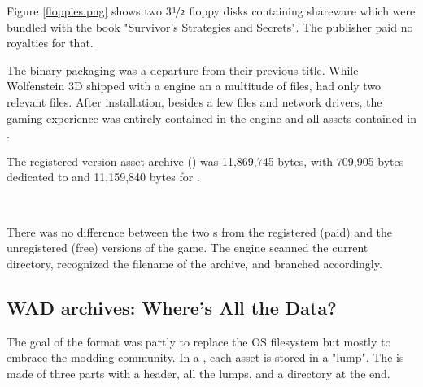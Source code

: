\par
\vspace{-10pt}
Figure \ref{floppies.png} shows two 3$\nicefrac{1}{2}$ floppy disks containing \doom{} shareware which were bundled with the book "Survivor's Strategies and Secrets". The publisher paid no royalties for that.\\
\par
The binary packaging was a departure from their previous title. While Wolfenstein 3D shipped with a  engine an a multitude of  files, \doom{} had only two relevant files. After installation, besides a few  files and network drivers, the gaming experience was entirely contained in the engine  and all assets contained in .\\
\vspace{3mm}

\vspace{2mm}
The registered version asset archive () was 11,869,745 bytes, with 709,905 bytes dedicated to  and 11,159,840 bytes for .
\pagebreak

\\
\par
There was no difference between the two s from the registered (paid) and the unregistered (free) versions of the game. The engine scanned the current directory, recognized the filename of the  archive, and branched accordingly.\\
\par
{}
%  




\subsection{WAD archives: Where's All the Data?}
\label{wad_explained}
The goal of the  format was partly to replace the OS filesystem but mostly to embrace the modding community. In a , each asset is stored in a "lump". The  is made of three parts with a header, all the lumps, and a directory at the end.\\

